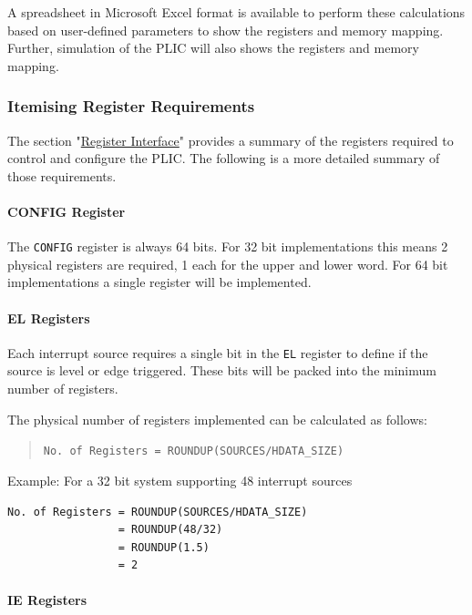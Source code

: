 \documentclass[]{article}
\begin{document}
A spreadsheet in Microsoft Excel format is available to perform these
calculations based on user-defined parameters to show the registers and
memory mapping. Further, simulation of the PLIC will also shows the
registers and memory mapping.

\subsubsection{Itemising Register Requirements}

The section "\protect\hyperlink{register-interface}{Register Interface}"
provides a summary of the registers required to control and configure
the PLIC. The following is a more detailed summary of those
requirements.

\paragraph{CONFIG Register}

The \texttt{CONFIG} register is always 64 bits. For 32 bit
implementations this means 2 physical registers are required, 1 each for
the upper and lower word. For 64 bit implementations a single register
will be implemented.

\paragraph{EL Registers}

Each interrupt source requires a single bit in the \texttt{EL} register
to define if the source is level or edge triggered. These bits will be
packed into the minimum number of registers.

The physical number of registers implemented can be calculated as
follows:

\begin{quote}
\texttt{No.\ of\ Registers\ =\ ROUNDUP(SOURCES/HDATA\_SIZE)}
\end{quote}

Example: For a 32 bit system supporting 48 interrupt sources

\begin{verbatim}
No. of Registers = ROUNDUP(SOURCES/HDATA_SIZE)   
                 = ROUNDUP(48/32)
                 = ROUNDUP(1.5)
                 = 2
\end{verbatim}

\paragraph{IE Registers}
\end{document}
